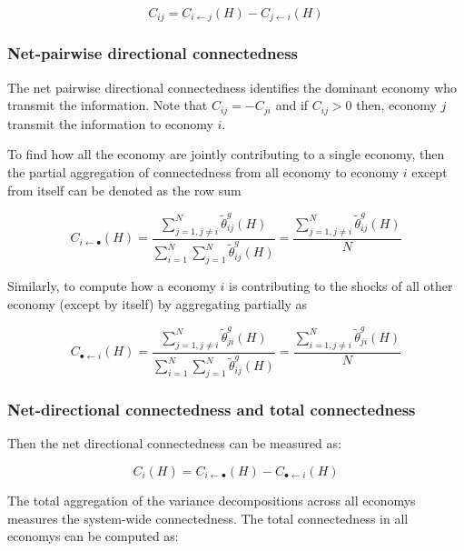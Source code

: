 \documentclass[]{elsarticle} %
\begin{document}
\[{{C}_{ij}}={{C}_{i\leftarrow j}}\left( H \right)-{{C}_{j\leftarrow i}}\left( H \right)\]

\subsubsection{\texorpdfstring{\textbf{Net-pairwise directional
connectedness}}{Net-pairwise directional connectedness}}\label{net-pairwise-directional-connectedness}

The net pairwise directional connectedness identifies the dominant
economy who transmit the information. Note that
\({{C}_{ij}}=-{{C}_{ji}}\) and if \({{C}_{ij}}>0\) then, economy
\(j\)transmit the information to economy \(i\).

To find how all the economy are jointly contributing to a single
economy, then the partial aggregation of connectedness from all economy
to economy \(i\) except from itself can be denoted as the row sum

\[{{C}_{i\leftarrow \bullet }}\left( H \right)=\frac{\sum\nolimits_{j=1,j\ne i}^{N}{\tilde{\theta }_{ij}^{g}\left( H \right)}}{\sum\nolimits_{i=1}^{N}{\sum\nolimits_{j=1}^{N}{\tilde{\theta }_{ij}^{g}\left( H \right)}}}=\frac{\sum\nolimits_{j=1,j\ne i}^{N}{\tilde{\theta }_{ij}^{g}\left( H \right)}}{N}\]

Similarly, to compute how a economy \(i\) is contributing to the shocks
of all other economy (except by itself) by aggregating partially as

\[{{C}_{\bullet \leftarrow i}}\left( H \right)=\frac{\sum\nolimits_{j=1,j\ne i}^{N}{\tilde{\theta }_{ji}^{g}\left( H \right)}}{\sum\nolimits_{i=1}^{N}{\sum\nolimits_{j=1}^{N}{\tilde{\theta }_{ij}^{g}\left( H \right)}}}=\frac{\sum\nolimits_{i=1,j\ne i}^{N}{\tilde{\theta }_{ji}^{g}\left( H \right)}}{N}\]

\subsubsection{\texorpdfstring{\textbf{Net-directional connectedness and
total
connectedness}}{Net-directional connectedness and total connectedness}}\label{net-directional-connectedness-and-total-connectedness}

Then the net directional connectedness can be measured as:

\[{{C}_{i}}\left( H \right)={{C}_{i\leftarrow \bullet }}\left( H \right)-{{C}_{\bullet \leftarrow i}}\left( H \right)\]

The total aggregation of the variance decompositions across all economys
measures the system-wide connectedness. The total connectedness in all
economys can be computed as:
\end{document}
